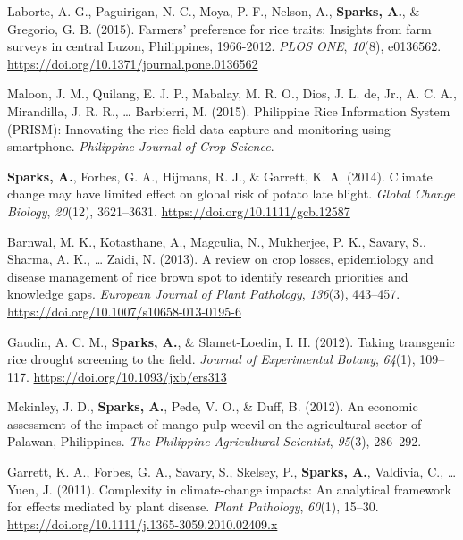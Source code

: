 \documentclass[11pt, a4paper]{awesome-cv}
\begin{document}
\leavevmode\hypertarget{ref-Laborte2015}{}%
Laborte, A. G., Paguirigan, N. C., Moya, P. F., Nelson, A.,
\textbf{Sparks, A.}, \& Gregorio, G. B. (2015). Farmers' preference for
rice traits: {Insights} from farm surveys in central {Luzon,
Philippines}, 1966-2012. \emph{PLOS ONE}, \emph{10}(8), e0136562.
\url{https://doi.org/10.1371/journal.pone.0136562}

\leavevmode\hypertarget{ref-Maloon2015}{}%
Maloon, J. M., Quilang, E. J. P., Mabalay, M. R. O., Dios, J. L. de,
Jr., A. C. A., Mirandilla, J. R. R., \ldots{} Barbierri, M. (2015).
{Philippine Rice Information System (PRISM)}: Innovating the rice field
data capture and monitoring using smartphone. \emph{Philippine Journal
of Crop Science}.

\leavevmode\hypertarget{ref-Sparks2014}{}%
\textbf{Sparks, A.}, Forbes, G. A., Hijmans, R. J., \& Garrett, K. A.
(2014). Climate change may have limited effect on global risk of potato
late blight. \emph{Global Change Biology}, \emph{20}(12), 3621--3631.
\url{https://doi.org/10.1111/gcb.12587}

\leavevmode\hypertarget{ref-Barnwal2013}{}%
Barnwal, M. K., Kotasthane, A., Magculia, N., Mukherjee, P. K., Savary,
S., Sharma, A. K., \ldots{} Zaidi, N. (2013). A review on crop losses,
epidemiology and disease management of rice brown spot to identify
research priorities and knowledge gaps. \emph{European Journal of Plant
Pathology}, \emph{136}(3), 443--457.
\url{https://doi.org/10.1007/s10658-013-0195-6}

\leavevmode\hypertarget{ref-Gaudin2012}{}%
Gaudin, A. C. M., \textbf{Sparks, A.}, \& Slamet-Loedin, I. H. (2012).
Taking transgenic rice drought screening to the field. \emph{Journal of
Experimental Botany}, \emph{64}(1), 109--117.
\url{https://doi.org/10.1093/jxb/ers313}

\leavevmode\hypertarget{ref-Mckinley2012}{}%
Mckinley, J. D., \textbf{Sparks, A.}, Pede, V. O., \& Duff, B. (2012).
An economic assessment of the impact of mango pulp weevil on the
agricultural sector of {Palawan, Philippines}. \emph{The Philippine
Agricultural Scientist}, \emph{95}(3), 286--292.

\leavevmode\hypertarget{ref-Garrett2011}{}%
Garrett, K. A., Forbes, G. A., Savary, S., Skelsey, P.,
\textbf{Sparks, A.}, Valdivia, C., \ldots{} Yuen, J. (2011). Complexity
in climate-change impacts: An analytical framework for effects mediated
by plant disease. \emph{Plant Pathology}, \emph{60}(1), 15--30.
\url{https://doi.org/10.1111/j.1365-3059.2010.02409.x}
\end{document}
